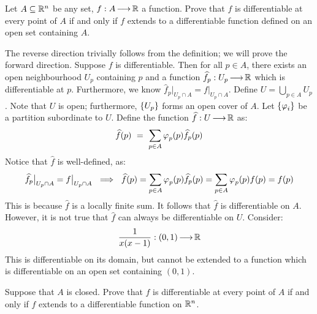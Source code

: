 \newpage
\label{q36}
\begin{qu}[num=36.1]
    Let $ A \subseteq \mathbb{R}^{n} $ be any set, $ f: A \operatorname{\longrightarrow} \mathbb{R} $ a function.
    Prove that $ f $ is differentiable at every point of $ A $ if and only if
    $ f $ extends to a differentiable function defined on an open set containing
    $ A $.
\end{qu}

\begin{soln}
    The reverse direction trivially follows from the definition; we will prove
    the forward direction. \vsp
    Suppose $ f $ is differentiable. Then for all
    $ p \in A $, there exists an open neighbourhood $ U_{p} $ containing $ p $
    and a function $ \widehat{f}_{p}: U_{p} \operatorname{\longrightarrow} \mathbb{R} $ which is differentiable at
    $ p $. Furthermore, we know $ \hat{f}_{p}\rvert_{U_{p}\cap A} =
    f\rvert_{U_{p}\cap A} $. Define $ U = \bigcup_{p\in A}U_{p} $. Note that
    $ U $ is open; furthermore, $ \left\{{U_{p}}\right\} $ forms an open cover of $ A $.
    \vsp
    Let $ \left\{{\operatorname{\varphi}_{i}}\right\} $ be a partition subordinate to $ U $. Define the
    function $ \widehat{f}:U \operatorname{\longrightarrow} \mathbb{R} $ as:
    \begin{equation*}
        \widehat{f}(p) \ = \ \sum_{p\in A}\operatorname{\varphi}_{p}(p)\widehat{f}_{p}(p)
    \end{equation*}
    Notice that $ \hat{f} $ is well-defined, as:
    \begin{equation*}
        \widehat{f}_{p}\big\rvert_{U_{p}\cap A} = f\big\rvert_{U_{p}\cap A}
        \ \implies \ \widehat{f}(p) = \sum_{p \in A}\operatorname{\varphi}_{p}(p)\widehat{f}_{p}(p)
        = \sum_{p \in A}\operatorname{\varphi}_{p}(p)f(p) = f(p)
    \end{equation*}
    This is because $ \hat{f} $ is a locally finite sum. It follows that
    $ \hat{f} $ is differentiable on $ A $. \vsp
    However, it is not true that $ \hat{f} $ can always be differentiable on 
    $ U $. Consider:
    \begin{equation*}
        \frac{1}{x(x-1)}:(0,1) \operatorname{\longrightarrow} \mathbb{R}
    \end{equation*}
    This is differentiable on its domain, but cannot be extended to a function
    which is differentiable on an open set containing $ (0,1) $.
\end{soln}

\begin{qu}[num=36.2]
    Suppose that $ A $ is closed. Prove that $ f $ is differentiable at every
    point of $ A $ if and only if $ f $ extends to a differentiable function on
    $ \mathbb{R}^{n} $.
\end{qu}

